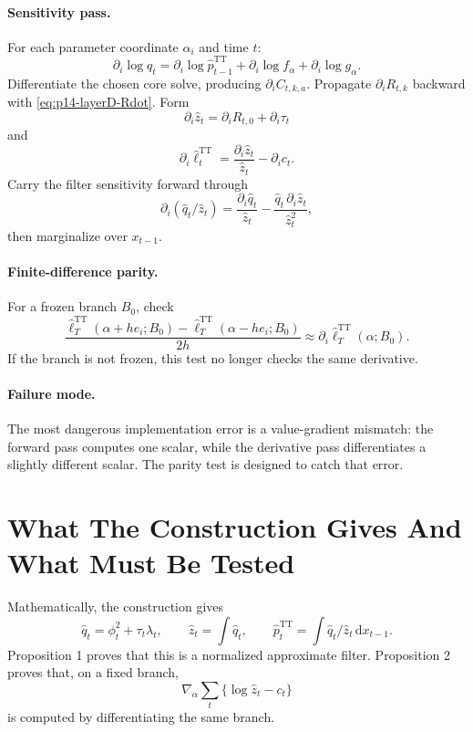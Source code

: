 \documentclass[11pt]{article}
\newcommand{\dd}{\mathrm{d}}
\newcommand{\TT}{\mathrm{TT}}
\renewcommand{\[}{\begin{equation}}
\renewcommand{\]}{\end{equation}}
\theoremstyle{definition}
\theoremstyle{remark}
\begin{document}
\paragraph{Sensitivity pass.}
For each parameter coordinate \(\alpha_i\) and time \(t\):
\[
  \partial_i\log q_t
  =
  \partial_i\log\widehat p_{t-1}^{\TT}
  +
  \partial_i\log f_\alpha
  +
  \partial_i\log g_\alpha.
\]
Differentiate the chosen core solve, producing \(\partial_iC_{t,k,a}\).
Propagate \(\partial_iR_{t,k}\) backward with
\eqref{eq:p14-layerD-Rdot}.  Form
\[
  \partial_i\widehat z_t
  =
  \partial_iR_{t,0}+\partial_i\tau_t
\]
and
\[
  \partial_i\widehat\ell_t^{\TT}
  =
  \frac{\partial_i\widehat z_t}{\widehat z_t}
  -
  \partial_i c_t.
  \label{eq:p14-step-score}
\]
Carry the filter sensitivity forward through
\[
  \partial_i(\widehat q_t/\widehat z_t)
  =
  \frac{\partial_i\widehat q_t}{\widehat z_t}
  -
  \frac{\widehat q_t\,\partial_i\widehat z_t}{\widehat z_t^2},
  \label{eq:p14-normalized-density-dot}
\]
then marginalize over \(x_{t-1}\).

\paragraph{Finite-difference parity.}
For a frozen branch \(B_0\), check
\[
  \frac{
  \widehat\ell_T^{\TT}(\alpha+h e_i;B_0)
  -
  \widehat\ell_T^{\TT}(\alpha-h e_i;B_0)}
  {2h}
  \approx
  \partial_i\widehat\ell_T^{\TT}(\alpha;B_0).
  \label{eq:p14-parity}
\]
If the branch is not frozen, this test no longer checks the same derivative.

\paragraph{Failure mode.}
The most dangerous implementation error is a value-gradient mismatch: the
forward pass computes one scalar, while the derivative pass differentiates a
slightly different scalar.  The parity test is designed to catch that error.

\section{What The Construction Gives And What Must Be Tested}

Mathematically, the construction gives
\[
  \widehat q_t=\phi_t^2+\tau_t\lambda_t,\qquad
  \widehat z_t=\int\widehat q_t,\qquad
  \widehat p_t^{\TT}=\int\widehat q_t/\widehat z_t\,\dd x_{t-1}.
\]
Proposition 1 proves that this is a normalized approximate filter.  Proposition
2 proves that, on a fixed branch,
\[
  \nabla_\alpha
  \sum_t\{\log\widehat z_t-c_t\}
\]
is computed by differentiating the same branch.
\end{document}

